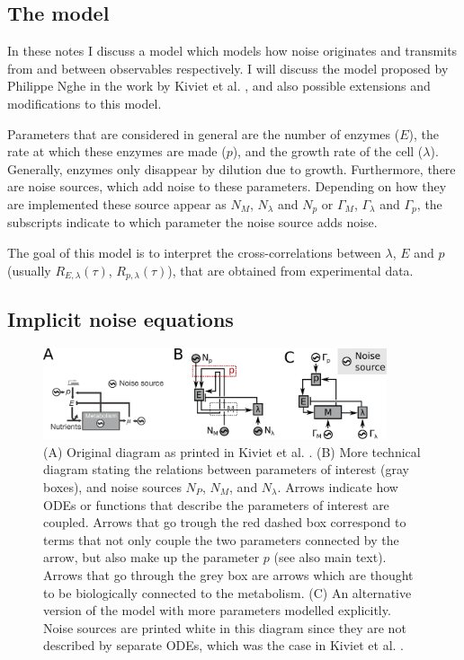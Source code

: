\documentclass[a4paper,twoside,10pt]{report}
\begin{document}
\subsection{The model}

In these notes I discuss a model which models how noise originates and transmits from and between observables respectively. I will discuss the model proposed by Philippe Nghe in the work by Kiviet et al. \cite{Kiviet2014}, and also possible extensions and modifications to this model.

Parameters that are considered in general are the number of enzymes ($E$), the rate at which these enzymes are made ($p$), and the growth rate of the cell ($\lambda$). Generally, enzymes only disappear by dilution due to growth. Furthermore, there are noise sources, which add noise to these parameters. Depending on how they are implemented these source appear as $N_M$, $N_\lambda$ and $N_p$ or $\Gamma_M$, $\Gamma_\lambda$ and $\Gamma_p$, the subscripts indicate to which parameter the noise source adds noise.

The goal of this model is to interpret the cross-correlations between $\lambda$, $E$ and $p$ (usually $R_{E,\lambda}(\tau)$, $R_{p,\lambda}(\tau)$), that are obtained from experimental data.

\subsection{Implicit noise equations}


\begin{figure}
	\centering
	\includegraphics[width=0.9\textwidth]{./drawings_png/model_nghe_v2.png}
	\caption{ 
		(A) Original diagram as printed in Kiviet et al. \cite{Kiviet2014}.
		(B) More technical diagram stating the relations between parameters of interest (gray boxes), and noise sources $N_P$, $N_M$, and $N_\lambda$. Arrows indicate how ODEs or functions that describe the parameters of interest are coupled. 
		Arrows that go trough the red dashed box correspond to terms that not only couple the two parameters connected by the arrow, but also make up the parameter $p$ (see also main text).
		Arrows that go through the grey box are arrows which are thought to be biologically connected to the metabolism.
		(C) An alternative version of the model with more parameters modelled explicitly. Noise sources are printed white in this diagram since they are not described by separate ODEs, which was the case in Kiviet et al. \cite{Kiviet2014}. 
	}
	\label{fig:modeldrawing}
\end{figure}
\end{document}
